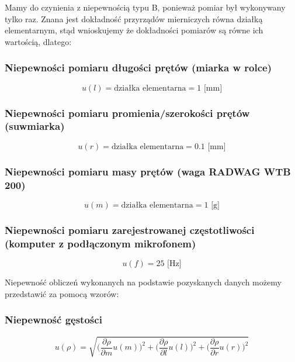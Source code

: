 \documentclass[a4paper,12pts]{article}
\begin{document}
	Mamy do czynienia z niepewnością typu B, ponieważ pomiar był wykonywany tylko raz. Znana jest dokładność przyrządów mierniczych równa działką elementarnym, stąd wnioskujemy że dokładności pomiarów są równe ich wartością, dlatego:
	
	\subsubsection{Niepewności pomiaru długości prętów (miarka w rolce)}
	\begin{equation}
	u(l) = \textrm{działka elementarna} = 1 \textrm{ [mm]}
	\end{equation}
	
	\subsubsection{Niepewności pomiaru promienia/szerokości prętów (suwmiarka)}
		\begin{equation}
	u(r) = \textrm{działka elementarna} = 0.1 \textrm{ [mm]}
	\end{equation}
	
	\subsubsection{Niepewności pomiaru masy prętów (waga RADWAG WTB 200)}
	\begin{equation}
	u(m) = \textrm{działka elementarna} = 1 \textrm{ [g]}
	\end{equation}
	
	\subsubsection{Niepewności pomiaru zarejestrowanej częstotliwości (komputer z podłączonym mikrofonem)}
	\begin{equation}
	u(f) =  25 \textrm{ [Hz]}
	\end{equation}

	\begin{flushleft}
		\newpage Niepewność obliczeń wykonanych na podstawie pozyskanych danych możemy przedstawić za pomocą wzorów:
	\end{flushleft}

	\subsubsection{Niepewność gęstości}
	
	$$ u(\rho)=\sqrt{\bigg(\frac{\partial \rho}{\partial m}u(m)\bigg)^2+\bigg(\frac{\partial \rho}{\partial l}u(l)\bigg)^2+\bigg(\frac{\partial \rho}{\partial r}u(r)\bigg)^2}$$
	
\end{document}
